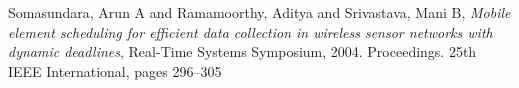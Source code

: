 \documentclass[12pt]{report}
\begin{document}
\begin{thebibliography}{9}

  Somasundara, Arun A and Ramamoorthy, Aditya and Srivastava, Mani B,
  \textit{Mobile element scheduling for efficient data collection in wireless sensor networks with dynamic deadlines},
  Real-Time Systems Symposium, 2004. Proceedings. 25th IEEE International, pages 296--305

\end{thebibliography}
\end{document}

